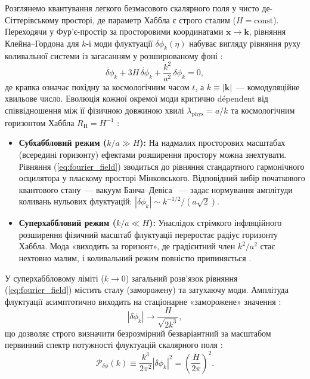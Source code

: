 \documentclass[12pt, a4paper]{article}
\begin{document}
Розглянемо квантування легкого безмасового скалярного поля у чисто де-Сіттерівському просторі, де параметр Хаббла є строго сталим ($H = \text{const}$). Переходячи у Фур'є-простір за просторовими координатами $\mathbf{x} \to \mathbf{k}$, рівняння Клейна--Гордона для $k$-ї моди флуктуації $\delta\phi_k(\eta)$ набуває вигляду рівняння руху коливальної системи із загасанням у розширюваному фоні \cite{mukhanov_2005}:
\begin{equation}\label{eq:fourier_field}
  \ddot{\delta\phi}_k + 3H\,\dot{\delta\phi}_k + \frac{k^2}{a^2}\,\delta\phi_k = 0,
\end{equation}
де крапка означає похідну за космологічним часом $t$, а $k \equiv |\mathbf{k}|$~--- комодуляційне хвильове число. Еволюція кожної окремої моди критично dépendent від співвідношення між її фізичною довжиною хвилі $\lambda_{\text{phys}} = a/k$ та космологічним горизонтом Хаббла $R_\mathrm{H} = H^{-1}$ \cite{mukhanov_chibisov_1981}:

\begin{itemize}
  \item \textbf{Субхаббловий режим ($k/a \gg H$):} На надмалих просторових масштабах (всередині горизонту) ефектами розширення простору можна знехтувати. Рівняння (\ref{eq:fourier_field}) зводиться до рівняння стандартного гармонічного осцилятора у пласкому просторі Мінковського. Відповідний вибір початкового квантового стану~--- вакуум Банча--Девіса \cite{bunch_davies_1978}~--- задає нормування амплітуди коливань нульових флуктуацій: $|\delta\phi_k| \sim k^{-1/2} / (a\sqrt{2})$.
  \item \textbf{Суперхаббловий режим ($k/a \ll H$):} Унаслідок стрімкого інфляційного розширення фізичний масштаб флуктуації переростає радіус горизонту Хаббла. Мода «виходить за горизонт», де градієнтний член $k^2/a^2$ стає нехтовно малим, і коливальний режим повністю припиняється \cite{hawking_1982}.
\end{itemize}

У суперхаббловому ліміті ($k \to 0$) загальний розв'язок рівняння (\ref{eq:fourier_field}) містить сталу (заморожену) та затухаючу моди. Амплітуда флуктуації асимптотично виходить на стаціонарне «заморожене» значення \cite{guth_pi_1982}:
\begin{equation*}
  |\delta\phi_k| \to \frac{H}{\sqrt{2k^3}},
\end{equation*}
що дозволяє строго визначити безрозмірний безваріантний за масштабом первинний спектр потужності флуктуацій скалярного поля \cite{mukhanov_chibisov_1981}:
\begin{equation}\label{eq:field_power_spec}
  \mathcal{P}_{\delta\phi}(k) \equiv \frac{k^3}{2\pi^2}|\delta\phi_k|^2 = \left(\frac{H}{2\pi}\right)^2.
\end{equation}
\end{document}
